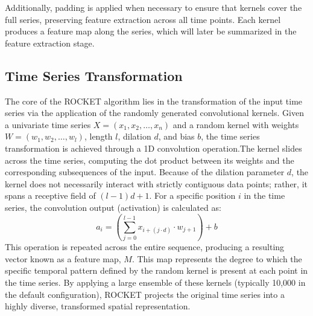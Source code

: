 Additionally, padding is applied when necessary to ensure that kernels cover the full series, preserving feature extraction across all time points. Each kernel produces a feature map along the series, which will later be summarized in the feature extraction stage.

\subsection{Time Series Transformation}
The core of the ROCKET algorithm lies in the transformation of the input time series via the application of the randomly generated convolutional kernels. Given a univariate time series $X = (x_1, x_2, \dots, x_n)$ and a random kernel with weights $W = (w_1, w_2, \dots, w_l)$, length $l$, dilation $d$, and bias $b$, the time series transformation is achieved through a 1D convolution operation.The kernel slides across the time series, computing the dot product between its weights and the corresponding subsequences of the input. Because of the dilation parameter $d$, the kernel does not necessarily interact with strictly contiguous data points; rather, it spans a receptive field of $(l - 1)d + 1$. For a specific position $i$ in the time series, the convolution output (activation) is calculated as:$$a_i = \left( \sum_{j=0}^{l-1} x_{i+(j \cdot d)} \cdot w_{j+1} \right) + b$$This operation is repeated across the entire sequence, producing a resulting vector known as a feature map, $M$. This map represents the degree to which the specific temporal pattern defined by the random kernel is present at each point in the time series. By applying a large ensemble of these kernels (typically 10,000 in the default configuration), ROCKET projects the original time series into a highly diverse, transformed spatial representation.


